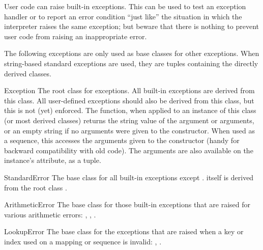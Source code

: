 User code can raise built-in exceptions.  This can be used to test an
exception handler or to report an error condition ``just like'' the
situation in which the interpreter raises the same exception; but
beware that there is nothing to prevent user code from raising an
inappropriate error.


The following exceptions are only used as base classes for other
exceptions.  When string-based standard exceptions are used, they
are tuples containing the directly derived classes.

\begin{excdesc}{Exception}
The root class for exceptions.  All built-in exceptions are derived
from this class.  All user-defined exceptions should also be derived
from this class, but this is not (yet) enforced.  The 
function, when applied to an instance of this class (or most derived
classes) returns the string value of the argument or arguments, or an
empty string if no arguments were given to the constructor.  When used
as a sequence, this accesses the arguments given to the constructor
(handy for backward compatibility with old code).  The arguments are
also available on the instance's  attribute, as a tuple.
\end{excdesc}

\begin{excdesc}{StandardError}
The base class for all built-in exceptions except
.   itself is derived
from the root class
.
\end{excdesc}

\begin{excdesc}{ArithmeticError}
The base class for those built-in exceptions that are raised for
various arithmetic errors: ,
, .
\end{excdesc}

\begin{excdesc}{LookupError}
The base class for the exceptions that are raised when a key or
index used on a mapping or sequence is invalid: ,
.
\end{excdesc}

